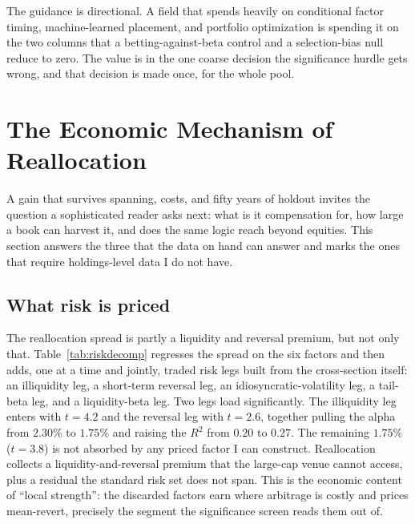 \documentclass[12pt]{article}
\theoremstyle{plain}
\theoremstyle{definition}
\begin{document}
The guidance is directional. A field that spends heavily on conditional factor
timing, machine-learned placement, and portfolio optimization is spending it on
the two columns that a betting-against-beta control and a selection-bias null
reduce to zero. The value is in the one coarse decision the significance hurdle
gets wrong, and that decision is made once, for the whole pool.

\section{The Economic Mechanism of Reallocation}
\label{sec:mechanism}

A gain that survives spanning, costs, and fifty years of holdout invites the
question a sophisticated reader asks next: what is it compensation for, how large
a book can harvest it, and does the same logic reach beyond equities. This
section answers the three that the data on hand can answer and marks the ones
that require holdings-level data I do not have.

\subsection{What risk is priced}
The reallocation spread is partly a liquidity and reversal premium, but not only
that. Table~\ref{tab:riskdecomp} regresses the spread on the six factors and then
adds, one at a time and jointly, traded risk legs built from the cross-section
itself: an illiquidity leg, a short-term reversal leg, an idiosyncratic-volatility
leg, a tail-beta leg, and a liquidity-beta leg. Two legs load significantly. The
illiquidity leg enters with $t=4.2$ and the reversal leg with $t=2.6$, together
pulling the alpha from $2.30\%$ to $1.75\%$ and raising the $R^2$ from $0.20$ to
$0.27$. The remaining $1.75\%$ ($t=3.8$) is not absorbed by any priced factor I
can construct. Reallocation collects a liquidity-and-reversal premium that the
large-cap venue cannot access, plus a residual the standard risk set does not
span. This is the economic content of ``local strength'': the discarded factors
earn where arbitrage is costly and prices mean-revert, precisely the segment the
significance screen reads them out of.
\end{document}
